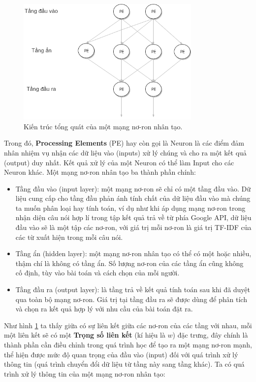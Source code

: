 \documentclass[12pt]{report}
\begin{document}
\begin{figure}[H]
	\centering
	\includegraphics[width=9cm]{Pics/Chap5/ann1.png}
	\caption{Kiến trúc tổng quát của một mạng nơ-ron nhân tạo.}
	\label{fig:ann-model}
\end{figure}

Trong đó, \textbf{Processing Elements} (PE) hay còn gọi là Neuron là các điểm đảm nhân nhiệm vụ nhận các dữ liệu vào (inputs) xử lý chúng và cho ra một kết quả (output) duy nhất. Kết quả xử lý của một Neuron có thể làm Input cho các Neuron khác. Một mạng nơ-ron nhân tạo ba thành phần chính:

\begin{itemize}
	\item Tầng đầu vào (input layer): một mạng nơ-ron sẽ chỉ có một tầng đầu vào. Dữ liệu cung cấp cho tầng đầu phản ánh tính chất của dữ liệu đầu vào mà chúng ta muốn phân loại hay tính toán, ví dụ như khi áp dụng mạng nơ-ron trong nhận diện câu nói hợp lí trong tập kết quả trả về từ phía Google API, dữ liệu đầu vào sẽ là một tập các nơ-ron, với giá trị mỗi nơ-ron là giá trị TF-IDF của các từ xuất hiện trong mỗi câu nói.
	\item Tầng ẩn (hidden layer): một mạng nơ-ron nhân tạo có thể có một hoặc nhiều, thậm chí là không có tầng ẩn. Số lượng nơ-ron của các tầng ẩn cũng không cố định, tùy vào bài toán và cách chọn của mỗi người.
	\item Tầng đầu ra (output layer): là tầng trả về kết quả tính toán sau khi đã duyệt qua toàn bộ mạng nơ-ron. Giá trị tại tầng đầu ra sẽ được dùng để phân tích và chọn ra kết quả hợp lý với nhu cầu của bài toán đặt ra.
\end{itemize}

Như hình \ref{fig:ann-model} ta thấy giữa có sự liên kết giữa các nơ-ron của các tầng với nhau, mỗi một liên kết sẽ có một \textbf{Trọng số liên kết} (kí hiệu là $w$) đặc trưng, đây chính là thành phần cần điều chỉnh trong quá trình học để tạo ra một mạng nơ-ron mạnh, thể hiện được mức độ quan trọng của đầu vào (input) đối với quá trình xử lý thông tin (quá trình chuyển đổi dữ liệu từ tầng này sang tầng khác). Ta có quá trình xử lý thông tin của một mạng nơ-ron nhân tạo:
\end{document}
